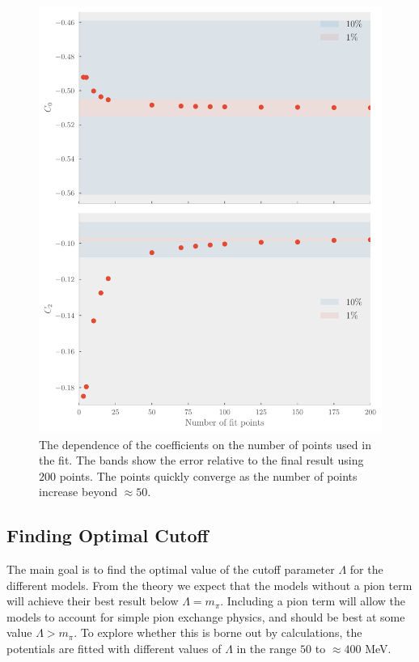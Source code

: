 \begin{figure}[pt]
  \centering
  \includegraphics{Figures/NLO_coeff_dependence.pdf}
  \caption{\label{fig:coefffitpoints} The dependence of the coefficients on the
    number of points used in the fit. The bands show the error relative to the
    final result using \(200\) points. The points quickly converge as the
    number of points increase beyond \(\approx 50\).}
\end{figure}

\newpage

\subsection{Finding Optimal Cutoff}

The main goal is to find the optimal value of the cutoff parameter \(\Lambda\)
for the different models. From the theory we expect that the models without a
pion term will achieve their best result below \(\Lambda=m_{\pi}\). Including a
pion term will allow the models to account for simple pion exchange physics, and
 should be best at some value \(\Lambda > m_{\pi}\). To explore whether this is
 borne out by calculations, the potentials are fitted with different values of
 \(\Lambda\) in the range \(50\) to \(\approx 400\) MeV. 

